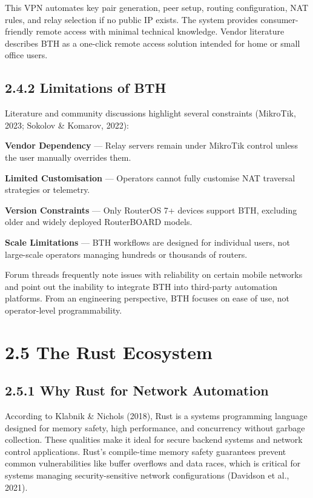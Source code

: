 \documentclass[12pt,a4paper,oneside]{report}
\begin{document}
This VPN automates key pair generation, peer setup, routing configuration, NAT rules, and relay selection if no public IP exists. The system provides consumer-friendly remote access with minimal technical knowledge. Vendor literature describes BTH as a one-click remote access solution intended for home or small office users.

\subsection{2.4.2 Limitations of BTH}

Literature and community discussions highlight several constraints (MikroTik, 2023; Sokolov \& Komarov, 2022):

\textbf{Vendor Dependency} --- Relay servers remain under MikroTik control unless the user manually overrides them.

\textbf{Limited Customisation} --- Operators cannot fully customise NAT traversal strategies or telemetry.

\textbf{Version Constraints} --- Only RouterOS 7+ devices support BTH, excluding older and widely deployed RouterBOARD models.

\textbf{Scale Limitations} --- BTH workflows are designed for individual users, not large-scale operators managing hundreds or thousands of routers.

Forum threads frequently note issues with reliability on certain mobile networks and point out the inability to integrate BTH into third-party automation platforms. From an engineering perspective, BTH focuses on ease of use, not operator-level programmability.

\section{2.5 The Rust Ecosystem}

\subsection{2.5.1 Why Rust for Network Automation}

According to Klabnik \& Nichols (2018), Rust is a systems programming language designed for memory safety, high performance, and concurrency without garbage collection. These qualities make it ideal for secure backend systems and network control applications. Rust's compile-time memory safety guarantees prevent common vulnerabilities like buffer overflows and data races, which is critical for systems managing security-sensitive network configurations (Davidson et al., 2021).
\end{document}

